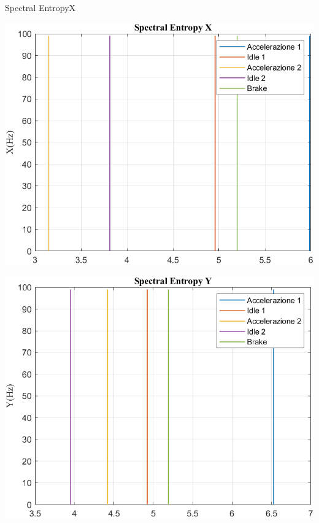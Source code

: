 \documentclass[beamer]{standalone}
\begin{document}
	\begin{frame}{{Spectral EntropyX}}
		\begin{minipage}{.45\textwidth}
			\centering\includegraphics[width=.9\textwidth]{figure/Acc/Trasformata/Spectral EntropyX}
		\end{minipage}
		\hspace{.05\textwidth}
		\begin{minipage}{.45\textwidth}
			\centering\includegraphics[width=.9\textwidth]{figure/Acc/Trasformata/Spectral EntropyY}
		\end{minipage}
	\end{frame}
	
\end{document}
